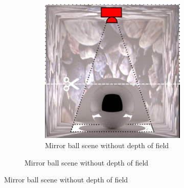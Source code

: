 \begin{figure}[]
    \centering    
    \begin{subfigure}{\textwidth}
        \centering
        \begin{subfigure}{0.5\textwidth}
            \centering
            \includegraphics[width=\textwidth]{images/04-experiment03/ball/scene.jpg}
            \caption*{Mirror ball scene without depth of field}
        \end{subfigure}


\end{subfigure}
\end{figure}
